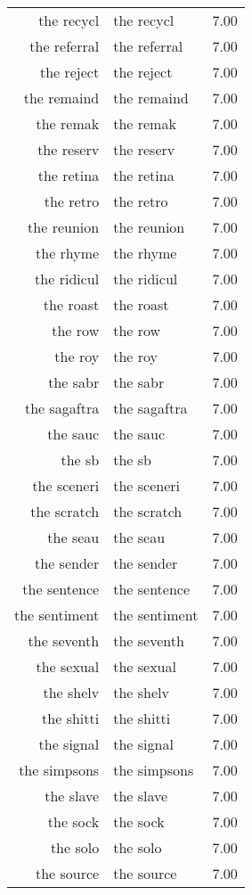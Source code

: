 \begin{table}[ht]
\begin{tabular}{rlr}
  the recycl & the recycl & 7.00 \\ 
  the referral & the referral & 7.00 \\ 
  the reject & the reject & 7.00 \\ 
  the remaind & the remaind & 7.00 \\ 
  the remak & the remak & 7.00 \\ 
  the reserv & the reserv & 7.00 \\ 
  the retina & the retina & 7.00 \\ 
  the retro & the retro & 7.00 \\ 
  the reunion & the reunion & 7.00 \\ 
  the rhyme & the rhyme & 7.00 \\ 
  the ridicul & the ridicul & 7.00 \\ 
  the roast & the roast & 7.00 \\ 
  the row & the row & 7.00 \\ 
  the roy & the roy & 7.00 \\ 
  the sabr & the sabr & 7.00 \\ 
  the sagaftra & the sagaftra & 7.00 \\ 
  the sauc & the sauc & 7.00 \\ 
  the sb & the sb & 7.00 \\ 
  the sceneri & the sceneri & 7.00 \\ 
  the scratch & the scratch & 7.00 \\ 
  the seau & the seau & 7.00 \\ 
  the sender & the sender & 7.00 \\ 
  the sentence & the sentence & 7.00 \\ 
  the sentiment & the sentiment & 7.00 \\ 
  the seventh & the seventh & 7.00 \\ 
  the sexual & the sexual & 7.00 \\ 
  the shelv & the shelv & 7.00 \\ 
  the shitti & the shitti & 7.00 \\ 
  the signal & the signal & 7.00 \\ 
  the simpsons & the simpsons & 7.00 \\ 
  the slave & the slave & 7.00 \\ 
  the sock & the sock & 7.00 \\ 
  the solo & the solo & 7.00 \\ 
  the source & the source & 7.00 \\ 

\end{tabular}
\end{table}
